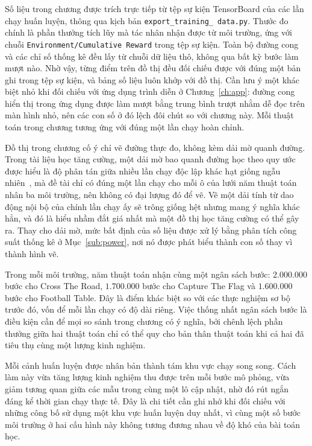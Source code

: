 \indent Số liệu trong chương được trích trực tiếp từ tệp sự kiện TensorBoard của các lần
chạy huấn luyện, thông qua kịch bản \texttt{export\_\allowbreak training\_\allowbreak
data.py}. Thước đo chính là phần thưởng tích lũy mà tác nhân nhận được từ môi trường, ứng
với chuỗi \texttt{Environment/\allowbreak Cumulative Reward} trong tệp sự kiện. Toàn bộ
đường cong và các chỉ số thống kê đều lấy từ chuỗi dữ liệu thô, không qua bất kỳ bước làm
mượt nào. Nhờ vậy, từng điểm trên đồ thị đều đối chiếu được với đúng một bản ghi trong tệp
sự kiện, và bảng số liệu luôn khớp với đồ thị. Cần lưu ý một khác biệt nhỏ khi đối chiếu
với ứng dụng trình diễn ở Chương~\ref{ch:app}: đường cong hiển thị trong ứng dụng được làm
mượt bằng trung bình trượt nhằm dễ đọc trên màn hình nhỏ, nên các con số ở đó lệch đôi
chút so với chương này. Mỗi thuật toán trong chương tương ứng với đúng một lần chạy hoàn
chỉnh.

\indent Đồ thị trong chương cố ý chỉ vẽ đường thực đo, không kèm dải mờ quanh đường. Trong
tài liệu học tăng cường, một dải mờ bao quanh đường học theo quy ước được hiểu là độ phân
tán giữa nhiều lần chạy độc lập khác hạt giống ngẫu nhiên~\cite{henderson2018matters,
agarwal2021precipice}, mà đề tài chỉ có đúng một lần chạy cho mỗi ô của lưới năm thuật toán
nhân ba môi trường, nên không có đại lượng đó để vẽ. Vẽ một dải tính từ dao động nội bộ của
chính lần chạy ấy sẽ trông giống hệt nhưng mang ý nghĩa khác hẳn, và đó là hiểu nhầm đắt giá
nhất mà một đồ thị học tăng cường có thể gây ra. Thay cho dải mờ, mức bất định của số liệu
được xử lý bằng phân tích công suất thống kê ở Mục~\ref{sub:power}, nơi nó được phát biểu
thành con số thay vì thành hình vẽ.

\indent Trong mỗi môi trường, năm thuật toán nhận cùng một ngân sách bước: $2.000.000$
bước cho Cross The Road, $1.700.000$ bước cho Capture The Flag và $1.600.000$ bước cho
Football Table. Đây là điểm khác biệt so với các thực nghiệm sơ bộ trước đó, vốn để mỗi
lần chạy có độ dài riêng. Việc thống nhất ngân sách bước là điều kiện cần để mọi so sánh
trong chương có ý nghĩa, bởi chênh lệch phần thưởng giữa hai thuật toán chỉ có thể quy cho
bản thân thuật toán khi cả hai đã tiêu thụ cùng một lượng kinh nghiệm.

\indent Mỗi cảnh huấn luyện được nhân bản thành tám khu vực chạy song song. Cách làm này
vừa tăng lượng kinh nghiệm thu được trên mỗi bước mô phỏng, vừa giảm tương quan giữa các
mẫu trong cùng một lô cập nhật, nhờ đó rút ngắn đáng kể thời gian chạy thực tế. Đây là chi
tiết cần ghi nhớ khi đối chiếu với những công bố sử dụng một khu vực huấn luyện duy nhất,
vì cùng một số bước môi trường ở hai cấu hình này không tương đương nhau về độ khó của bài
toán học.

